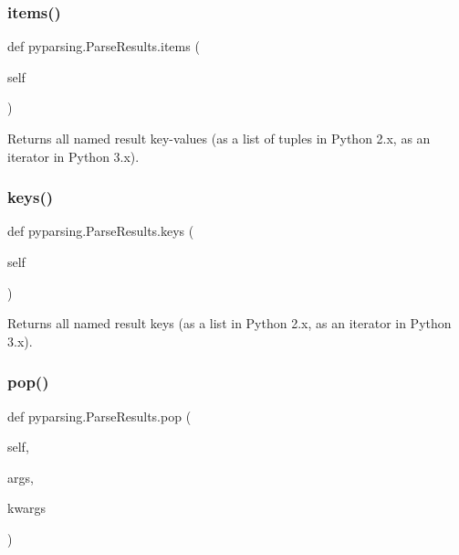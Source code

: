 \subsubsection{\texorpdfstring{items()}{items()}}
{\footnotesize\ttfamily def pyparsing.\+Parse\+Results.\+items (\begin{DoxyParamCaption}\item[{}]{self }\end{DoxyParamCaption})}

\begin{DoxyVerb}Returns all named result key-values (as a list of tuples in Python 2.x, as an iterator in Python 3.x).\end{DoxyVerb}
 \mbox{\label{classpyparsing_1_1ParseResults_acf67bd0c93d4fb61c1d18df637fa1d75}} 
\subsubsection{\texorpdfstring{keys()}{keys()}}
{\footnotesize\ttfamily def pyparsing.\+Parse\+Results.\+keys (\begin{DoxyParamCaption}\item[{}]{self }\end{DoxyParamCaption})}

\begin{DoxyVerb}Returns all named result keys (as a list in Python 2.x, as an iterator in Python 3.x).\end{DoxyVerb}
 \mbox{\label{classpyparsing_1_1ParseResults_a30101c59176b4e2a9cf7c80245c4c011}} 
\subsubsection{\texorpdfstring{pop()}{pop()}}
{\footnotesize\ttfamily def pyparsing.\+Parse\+Results.\+pop (\begin{DoxyParamCaption}\item[{}]{self,  }\item[{}]{args,  }\item[{}]{kwargs }\end{DoxyParamCaption})}

